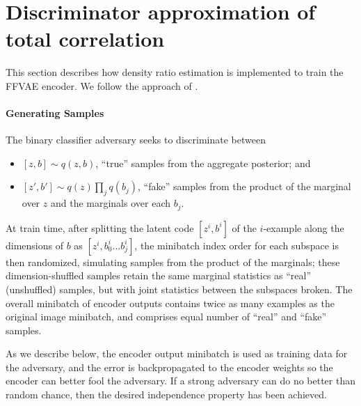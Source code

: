 \section{Discriminator approximation of total correlation} \label{sec:disc_approx}
This section describes how density ratio estimation is implemented to train the FFVAE encoder.
We follow the approach of \citet{kim2018disentangling}.
\paragraph{Generating Samples}
The binary classifier adversary seeks to discriminate between
\begin{itemize}
    \item $[z,b] \sim q(z,b)$, ``true'' samples from the aggregate posterior; and
    \item $[z',b'] \sim q(z)\prod_j q(b_j)$, ``fake'' samples from the product of the marginal over $z$ and the marginals over each $b_j$.
\end{itemize}
At train time, after splitting the latent code $[z^i,b^i]$ of the $i$-example along the dimensions of $b$ as $[z^i, b_0^i ... b_j^i]$, the minibatch index order for each subspace is then randomized, simulating samples from the product of the marginals; these dimension-shuffled samples retain the same marginal statistics as ``real'' (unshuffled) samples, but with joint statistics between the subspaces broken.
The overall minibatch of encoder outputs contains twice as many examples as the original image minibatch, and comprises equal number of ``real'' and ``fake'' samples.

As we describe below, the encoder output minibatch is used as training data for the adversary, and the error is backpropagated to the encoder weights so the encoder can better fool the adversary.
 If a strong adversary can do no better than random chance, then the desired independence property has been achieved.

